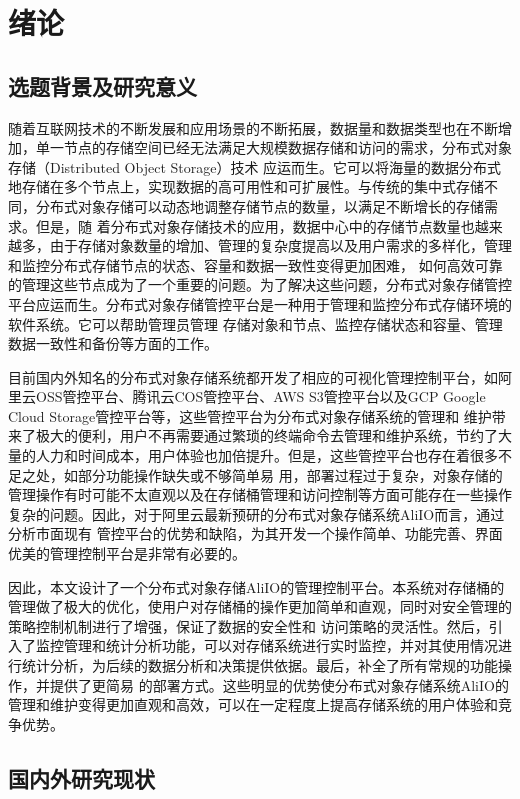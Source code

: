 \chapter{绪论}

\section{选题背景及研究意义}

随着互联网技术的不断发展和应用场景的不断拓展，数据量和数据类型也在不断增加，单一节点的存储空间已经无法满足大规模数据存储和访问的需求，分布式对象存储（Distributed Object Storage）技术
应运而生。它可以将海量的数据分布式地存储在多个节点上，实现数据的高可用性和可扩展性。与传统的集中式存储不同，分布式对象存储可以动态地调整存储节点的数量，以满足不断增长的存储需求。但是，随
着分布式对象存储技术的应用，数据中心中的存储节点数量也越来越多，由于存储对象数量的增加、管理的复杂度提高以及用户需求的多样化，管理和监控分布式存储节点的状态、容量和数据一致性变得更加困难，
如何高效可靠的管理这些节点成为了一个重要的问题。为了解决这些问题，分布式对象存储管控平台应运而生。分布式对象存储管控平台是一种用于管理和监控分布式存储环境的软件系统。它可以帮助管理员管理
存储对象和节点、监控存储状态和容量、管理数据一致性和备份等方面的工作。

目前国内外知名的分布式对象存储系统都开发了相应的可视化管理控制平台，如阿里云OSS管控平台、腾讯云COS管控平台、AWS S3管控平台以及GCP Google Cloud Storage管控平台等，这些管控平台为分布式对象存储系统的管理和
维护带来了极大的便利，用户不再需要通过繁琐的终端命令去管理和维护系统，节约了大量的人力和时间成本，用户体验也加倍提升。但是，这些管控平台也存在着很多不足之处，如部分功能操作缺失或不够简单易
用，部署过程过于复杂，对象存储的管理操作有时可能不太直观以及在存储桶管理和访问控制等方面可能存在一些操作复杂的问题。因此，对于阿里云最新预研的分布式对象存储系统AliIO而言，通过分析市面现有
管控平台的优势和缺陷，为其开发一个操作简单、功能完善、界面优美的管理控制平台是非常有必要的。

因此，本文设计了一个分布式对象存储AliIO的管理控制平台。本系统对存储桶的管理做了极大的优化，使用户对存储桶的操作更加简单和直观，同时对安全管理的策略控制机制进行了增强，保证了数据的安全性和
访问策略的灵活性。然后，引入了监控管理和统计分析功能，可以对存储系统进行实时监控，并对其使用情况进行统计分析，为后续的数据分析和决策提供依据。最后，补全了所有常规的功能操作，并提供了更简易
的部署方式。这些明显的优势使分布式对象存储系统AliIO的管理和维护变得更加直观和高效，可以在一定程度上提高存储系统的用户体验和竞争优势。


\section{国内外研究现状}

